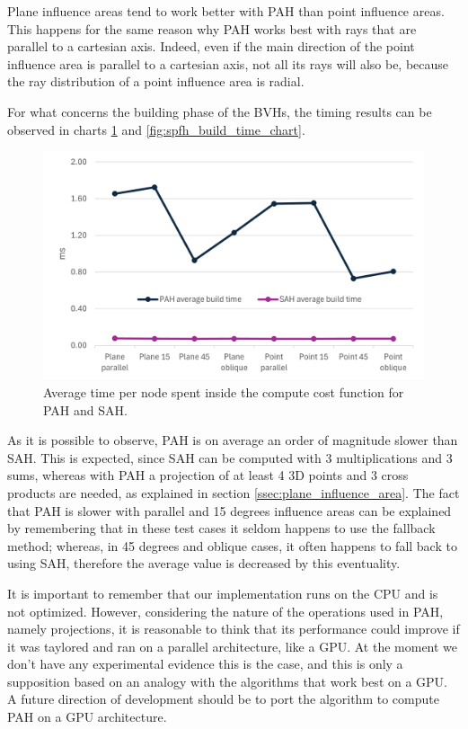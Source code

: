 \documentclass{PoliMi_MasterThesis}
\begin{document}
Plane influence areas tend to work better with PAH than point influence areas. This happens for the same reason why PAH works best with rays that are parallel to a cartesian axis. Indeed, even if the main direction of the point influence area is parallel to a cartesian axis, not all its rays will also be, because the ray distribution of a point influence area is radial.

For what concerns the building phase of the BVHs, the timing results can be observed in charts \ref{fig:pah_build_time_chart} and \ref{fig:spfh_build_time_chart}.

\begin{figure}[H] 
	\includegraphics[width=\textwidth]{Images/pah_build_time_chart.png}
	\caption{Average time per node spent inside the compute cost function for PAH and SAH.}
	\label{fig:pah_build_time_chart}
\end{figure}

As it is possible to observe, PAH is on average an order of magnitude slower than SAH. This is expected, since SAH can be computed with 3 multiplications and 3 sums, whereas with PAH a projection of at least 4 3D points and 3 cross products are needed, as explained in section \ref{ssec:plane_influence_area}. The fact that PAH is slower with parallel and 15 degrees influence areas can be explained by remembering that in these test cases it seldom happens to use the fallback method; whereas, in 45 degrees and oblique cases, it often happens to fall back to using SAH, therefore the average value is decreased by this eventuality.

It is important to remember that our implementation runs on the CPU and is not optimized. However, considering the nature of the operations used in PAH, namely projections, it is reasonable to think that its performance could improve if it was taylored and ran on a parallel architecture, like a GPU. At the moment we don't have any experimental evidence this is the case, and this is only a supposition based on an analogy with the algorithms that work best on a GPU. A future direction of development should be to port the algorithm to compute PAH on a GPU architecture.
\end{document}
